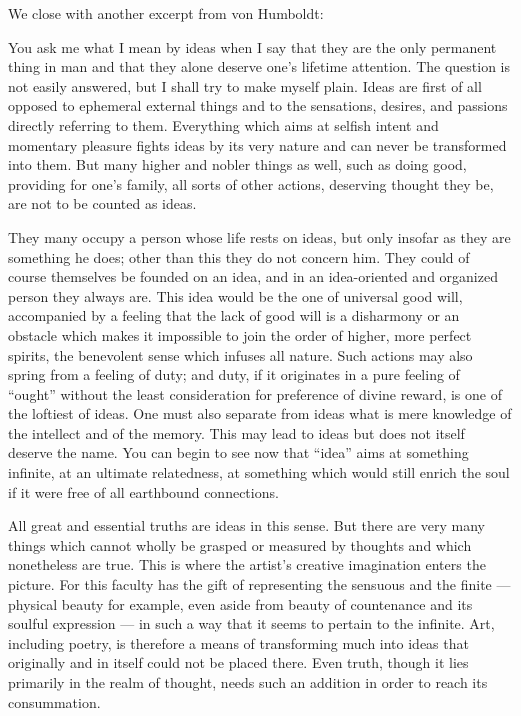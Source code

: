We close with another excerpt from von Humboldt:

\begin{quotationx}
You ask me what I mean by ideas when I say that they are the only permanent thing in man and that they alone deserve one's lifetime attention. The question is not easily answered, but I shall try to make myself plain. Ideas are first of all opposed to ephemeral external things and to the sensations, desires, and passions directly referring to them. Everything which aims at selfish intent and momentary pleasure fights ideas by its very nature and can never be transformed into them. But many higher and nobler things as well, such as doing good, providing for one's family, all sorts of other actions, deserving thought they be, are not to be counted as ideas.

They many occupy a person whose life rests on ideas, but only insofar as they are something he does; other than this they do not concern him. They could of course themselves be founded on an idea, and in an idea-oriented and organized person they always are. This idea would be the one of universal good will, accompanied by a feeling that the lack of good will is a disharmony or an obstacle which makes it impossible to join the order of higher, more perfect spirits, the benevolent sense which infuses all nature. Such actions may also spring from a feeling of duty; and duty, if it originates in a pure feeling of ``ought'' without the least consideration for preference of divine reward, is one of the loftiest of ideas. One must also separate from ideas what is mere knowledge of the intellect and of the memory. This may lead to ideas but does not itself deserve the name. You can begin to see now that ``idea'' aims at something infinite, at an ultimate relatedness, at something which would still enrich the soul if it were free of all earthbound connections.

All great and essential truths are ideas in this sense. But there are very many things which cannot wholly be grasped or measured by thoughts and which nonetheless are true. This is where the artist's creative imagination enters the picture. For this faculty has the gift of representing the sensuous and the finite --- physical beauty for example, even aside from beauty of countenance and its soulful expression --- in such a way that it seems to pertain to the infinite. Art, including poetry, is therefore a means of transforming much into ideas that originally and in itself could not be placed there. Even truth, though it lies primarily in the realm of thought, needs such an addition in order to reach its consummation.


\end{quotationx}
